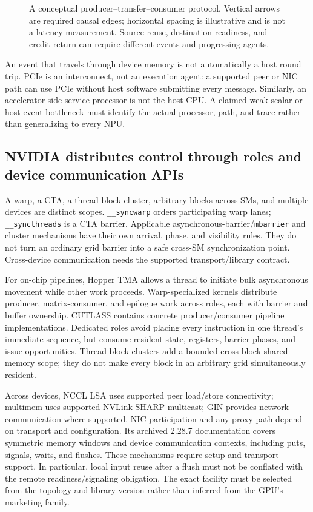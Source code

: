 \begin{figure}[tb]
\centering

\caption{A conceptual producer--transfer--consumer protocol. Vertical arrows are required causal edges; horizontal spacing is illustrative and is not a latency measurement. Source reuse, destination readiness, and credit return can require different events and progressing agents.}
\label{fig:u006-events}
\end{figure}

An event that travels through device memory is not automatically a host round trip. PCIe is an interconnect, not an execution agent: a supported peer or NIC path can use PCIe without host software submitting every message. Similarly, an accelerator-side service processor is not the host CPU. A claimed weak-scalar or host-event bottleneck must identify the actual processor, path, and trace rather than generalizing to every NPU.

\subsection{NVIDIA distributes control through roles and device communication APIs}

A warp, a CTA, a thread-block cluster, arbitrary blocks across SMs, and multiple devices are distinct scopes. \texttt{\_\_syncwarp} orders participating warp lanes; \texttt{\_\_syncthreads} is a CTA barrier. Applicable asynchronous-barrier/\texttt{mbarrier} and cluster mechanisms have their own arrival, phase, and visibility rules. They do not turn an ordinary grid barrier into a safe cross-SM synchronization point. Cross-device communication needs the supported transport/library contract.\citep{u006-cuda-scopes}

For on-chip pipelines, Hopper TMA allows a thread to initiate bulk asynchronous movement while other work proceeds. Warp-specialized kernels distribute producer, matrix-consumer, and epilogue work across roles, each with barrier and buffer ownership. CUTLASS contains concrete producer/consumer pipeline implementations. Dedicated roles avoid placing every instruction in one thread's immediate sequence, but consume resident state, registers, barrier phases, and issue opportunities. Thread-block clusters add a bounded cross-block shared-memory scope; they do not make every block in an arbitrary grid simultaneously resident.~\citep{u006-hopper,u006-cutlass}

Across devices, NCCL LSA uses supported peer load/store connectivity; multimem uses supported NVLink SHARP multicast; GIN provides network communication where supported. NIC participation and any proxy path depend on transport and configuration. Its archived 2.28.7 documentation covers symmetric memory windows and device communication contexts, including puts, signals, waits, and flushes. These mechanisms require setup and transport support. In particular, local input reuse after a flush must not be conflated with the remote readiness/signaling obligation. The exact facility must be selected from the topology and library version rather than inferred from the GPU's marketing family.~\citep{u006-nccl}

